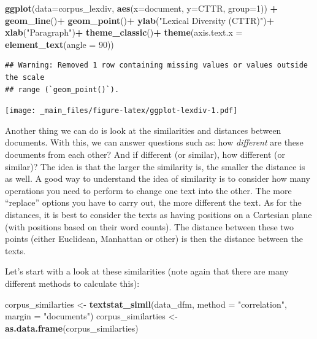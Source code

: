 \documentclass[
]{book}
\newenvironment{Shaded}{\begin{snugshade}}{\end{snugshade}}
\newcommand{\AttributeTok}[1]{\textcolor[rgb]{0.13,0.29,0.53}{#1}}
\newcommand{\DecValTok}[1]{\textcolor[rgb]{0.00,0.00,0.81}{#1}}
\newcommand{\FunctionTok}[1]{\textcolor[rgb]{0.13,0.29,0.53}{\textbf{#1}}}
\newcommand{\NormalTok}[1]{#1}
\newcommand{\OtherTok}[1]{\textcolor[rgb]{0.56,0.35,0.01}{#1}}
\newcommand{\SpecialCharTok}[1]{\textcolor[rgb]{0.81,0.36,0.00}{\textbf{#1}}}
\newcommand{\StringTok}[1]{\textcolor[rgb]{0.31,0.60,0.02}{#1}}
\begin{document}
\begin{Shaded}
\begin{Highlighting}[]
\FunctionTok{ggplot}\NormalTok{(}\AttributeTok{data=}\NormalTok{corpus\_lexdiv, }\FunctionTok{aes}\NormalTok{(}\AttributeTok{x=}\NormalTok{document, }\AttributeTok{y=}\NormalTok{CTTR, }\AttributeTok{group=}\DecValTok{1}\NormalTok{)) }\SpecialCharTok{+}
 \FunctionTok{geom\_line}\NormalTok{()}\SpecialCharTok{+}
 \FunctionTok{geom\_point}\NormalTok{()}\SpecialCharTok{+}
 \FunctionTok{ylab}\NormalTok{(}\StringTok{"Lexical Diversity (CTTR)"}\NormalTok{)}\SpecialCharTok{+}
 \FunctionTok{xlab}\NormalTok{(}\StringTok{"Paragraph"}\NormalTok{)}\SpecialCharTok{+}
 \FunctionTok{theme\_classic}\NormalTok{()}\SpecialCharTok{+}
 \FunctionTok{theme}\NormalTok{(}\AttributeTok{axis.text.x =} \FunctionTok{element\_text}\NormalTok{(}\AttributeTok{angle =} \DecValTok{90}\NormalTok{))}
\end{Highlighting}
\end{Shaded}

\begin{verbatim}
## Warning: Removed 1 row containing missing values or values outside the scale
## range (`geom_point()`).
\end{verbatim}

\texttt{[image: \_main\_files/figure-latex/ggplot-lexdiv-1.pdf]}

Another thing we can do is look at the similarities and distances between documents. With this, we can answer questions such as: how \emph{different} are these documents from each other? And if different (or similar), how different (or similar)? The idea is that the larger the similarity is, the smaller the distance is as well. A good way to understand the idea of similarity is to consider how many operations you need to perform to change one text into the other. The more ``replace'' options you have to carry out, the more different the text. As for the distances, it is best to consider the texts as having positions on a Cartesian plane (with positions based on their word counts). The distance between these two points (either Euclidean, Manhattan or other) is then the distance between the texts.

Let's start with a look at these similarities (note again that there are many different methods to calculate this):

\begin{Shaded}
\begin{Highlighting}[]
\NormalTok{corpus\_similarties }\OtherTok{\textless{}{-}} \FunctionTok{textstat\_simil}\NormalTok{(data\_dfm, }\AttributeTok{method =} \StringTok{"correlation"}\NormalTok{, }\AttributeTok{margin =} \StringTok{"documents"}\NormalTok{)}
\NormalTok{corpus\_similarties }\OtherTok{\textless{}{-}} \FunctionTok{as.data.frame}\NormalTok{(corpus\_similarties)}
\end{Highlighting}
\end{Shaded}
\end{document}

